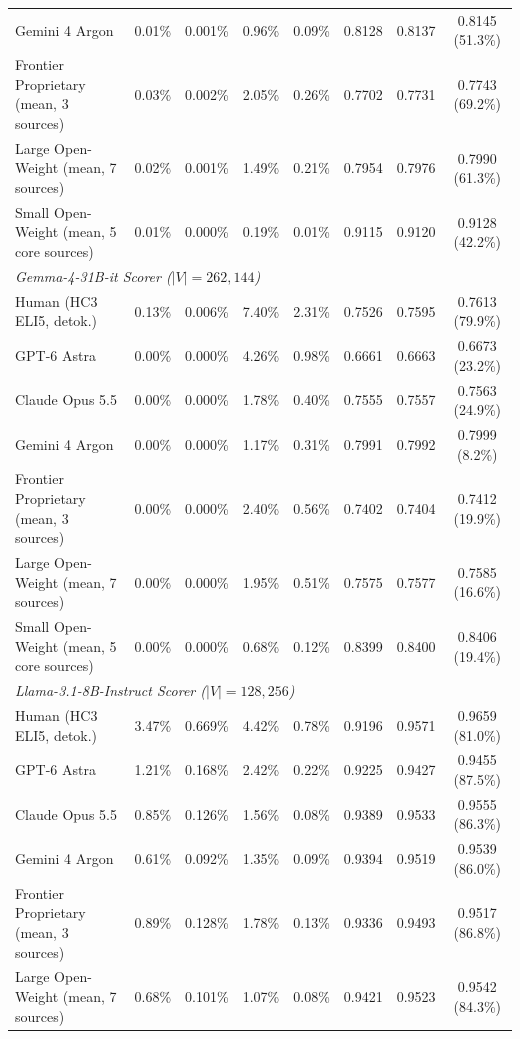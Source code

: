 \documentclass[11pt]{article}
\begin{document}
\begin{table}[t]
{\begin{tabular}{lccccccc}
Gemini 4 Argon & 0.01\% & 0.001\% & 0.96\% & 0.09\% & 0.8128 & 0.8137 & 0.8145 (51.3\%) \\
Frontier Proprietary (mean, 3 sources) & 0.03\% & 0.002\% & 2.05\% & 0.26\% & 0.7702 & 0.7731 & 0.7743 (69.2\%) \\
Large Open-Weight (mean, 7 sources) & 0.02\% & 0.001\% & 1.49\% & 0.21\% & 0.7954 & 0.7976 & 0.7990 (61.3\%) \\
Small Open-Weight (mean, 5 core sources) & 0.01\% & 0.000\% & 0.19\% & 0.01\% & 0.9115 & 0.9120 & 0.9128 (42.2\%) \\
\midrule
\multicolumn{8}{l}{\textit{Gemma-4-31B-it Scorer ($|V| = 262{{,}}144$)}} \\
Human (HC3 ELI5, detok.) & 0.13\% & 0.006\% & 7.40\% & 2.31\% & 0.7526 & 0.7595 & 0.7613 (79.9\%) \\
GPT-6 Astra & 0.00\% & 0.000\% & 4.26\% & 0.98\% & 0.6661 & 0.6663 & 0.6673 (23.2\%) \\
Claude Opus 5.5 & 0.00\% & 0.000\% & 1.78\% & 0.40\% & 0.7555 & 0.7557 & 0.7563 (24.9\%) \\
Gemini 4 Argon & 0.00\% & 0.000\% & 1.17\% & 0.31\% & 0.7991 & 0.7992 & 0.7999 (8.2\%) \\
Frontier Proprietary (mean, 3 sources) & 0.00\% & 0.000\% & 2.40\% & 0.56\% & 0.7402 & 0.7404 & 0.7412 (19.9\%) \\
Large Open-Weight (mean, 7 sources) & 0.00\% & 0.000\% & 1.95\% & 0.51\% & 0.7575 & 0.7577 & 0.7585 (16.6\%) \\
Small Open-Weight (mean, 5 core sources) & 0.00\% & 0.000\% & 0.68\% & 0.12\% & 0.8399 & 0.8400 & 0.8406 (19.4\%) \\
\midrule
\multicolumn{8}{l}{\textit{Llama-3.1-8B-Instruct Scorer ($|V| = 128{{,}}256$)}} \\
Human (HC3 ELI5, detok.) & 3.47\% & 0.669\% & 4.42\% & 0.78\% & 0.9196 & 0.9571 & 0.9659 (81.0\%) \\
GPT-6 Astra & 1.21\% & 0.168\% & 2.42\% & 0.22\% & 0.9225 & 0.9427 & 0.9455 (87.5\%) \\
Claude Opus 5.5 & 0.85\% & 0.126\% & 1.56\% & 0.08\% & 0.9389 & 0.9533 & 0.9555 (86.3\%) \\
Gemini 4 Argon & 0.61\% & 0.092\% & 1.35\% & 0.09\% & 0.9394 & 0.9519 & 0.9539 (86.0\%) \\
Frontier Proprietary (mean, 3 sources) & 0.89\% & 0.128\% & 1.78\% & 0.13\% & 0.9336 & 0.9493 & 0.9517 (86.8\%) \\
Large Open-Weight (mean, 7 sources) & 0.68\% & 0.101\% & 1.07\% & 0.08\% & 0.9421 & 0.9523 & 0.9542 (84.3\%) \\

\end{tabular}}
\end{table}
\end{document}
